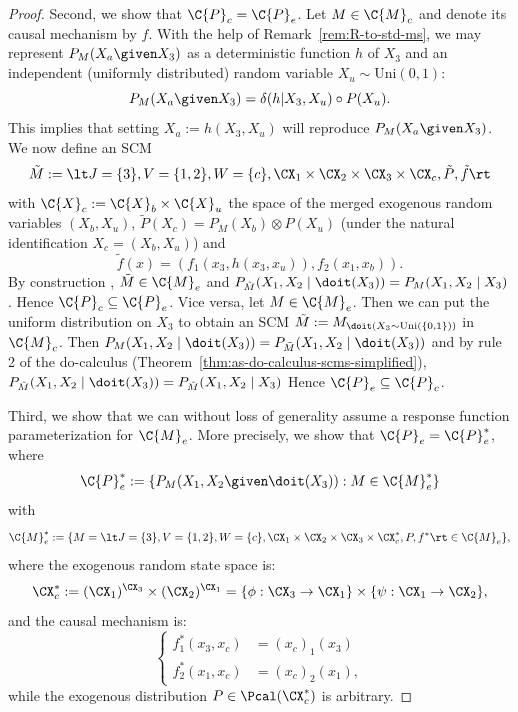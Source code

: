 \begin{proof}
  Second, we show that $\C{P}_c = \C{P}_e$.
  Let $M \in \C{M}_c$ and denote its causal mechanism by $f$.
  With the help of Remark~\ref{rem:R-to-std-ms}, we may represent $P_M(X_a \given X_3)$ as a deterministic function $h$ of $X_3$ and an independent (uniformly distributed) random variable $X_u \sim \mathrm{Uni}(0,1)$:
  $$P_M(X_a \given X_3) = \delta(h|X_3,X_u) \circ P(X_u).$$
  This implies that setting $X_a := h(X_3,X_u)$ will reproduce $P_M(X_a \given X_3)$.
  We now define an SCM
  $$\tilde{M} := \lt J=\{3\}, V=\{1,2\}, W=\{c\}, \CX_1 \times \CX_2 \times \CX_3 \times \CX_{c}, \tilde{P}, \tilde{f} \rt$$
  with $\C{X}_c := \C{X}_b \times \C{X}_u$ the space of the merged exogenous random variables $(X_b,X_u)$,
  $\tilde{P}(X_c) = P_M(X_b) \otimes P(X_u)$ (under the natural identification $X_c = (X_b,X_u)$) and
  $$\tilde{f}(x) = (f_1(x_3,h(x_3,x_u)),f_2(x_1,x_b)).$$
  By construction , $\tilde{M} \in \C{M}_e$ and $P_{\tilde{M}}(X_1,X_2 \mid \doit(X_3)) = P_M(X_1,X_2 \mid X_3)$.
  Hence $\C{P}_c \subseteq \C{P}_e$.
  Vice versa, let $M \in \C{M}_e$.
  Then we can put the uniform distribution on $X_3$ to obtain an SCM $\tilde{M} := M_{\doit(X_3 \sim \mathrm{Uni}(\{0,1\}))}$ in $\C{M}_c$.
  Then $P_M(X_1,X_2 \mid \doit(X_3)) = P_{\tilde{M}}(X_1,X_2 \mid \doit(X_3))$ and
  by rule 2 of the do-calculus (Theorem~\ref{thm:as-do-calculus-scms-simplified}),
  $P_{\tilde{M}}(X_1,X_2 \mid \doit(X_3)) = P_{\tilde{M}}(X_1,X_2 \mid X_3)$
  Hence $\C{P}_e \subseteq \C{P}_c$.

  Third, we show that we can without loss of generality assume a response function parameterization for $\C{M}_e$.
  More precisely, we show that $\C{P}_e = \C{P}_e^*$, where
  $$\C{P}_e^* := \{ P_M(X_1, X_2 \given \doit(X_3)) : M \in \C{M}_e^* \}$$
  with
  $$\C{M}_e^* := \{ M = \lt J=\{3\}, V=\{1,2\}, W=\{c\}, \CX_1 \times \CX_2 \times \CX_3 \times \CX_{c}^*, P, f^* \rt \in \C{M}_e \},$$
  where the exogenous random state space is:
  $$\CX_{c}^* := (\CX_1)^{\CX_3} \times (\CX_2)^{\CX_1} = \{\phi : \CX_3 \to \CX_1\} \times \{\psi : \CX_1 \to \CX_2\},$$
  and the causal mechanism is:
  $$\begin{cases}
    f^*_1(x_3,x_c) &= (x_c)_1(x_3) \\
    f^*_2(x_1,x_c) &= (x_c)_2(x_1),
  \end{cases}$$
  while the exogenous distribution $P \in \Pcal(\CX_{c}^*)$ is arbitrary.
  

\end{proof}
